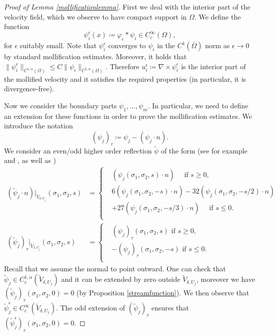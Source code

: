 \documentclass[12pt,a4paper]{article}
\theoremstyle{definition}
\theoremstyle{remark}
\numberwithin{equation}{section}
\begin{document}
\begin{proof}[Proof of Lemma \ref{mollificationlemma}]
First we deal with the interior part of the velocity field, which we observe to have compact support in $\Omega$. We define the function
\begin{equation*}
\psi^\epsilon_i (x) \coloneqq \varphi_\epsilon * \psi_i \in C_c^\infty (\Omega),
\end{equation*}
for $\epsilon$ suitably small. Note that $\psi^\epsilon_i$ converges to $\psi_i$ in the $C^1 (\overline{\Omega})$ norm as $\epsilon \rightarrow 0$ by standard mollification estimates. Moreover, it holds that $\lVert \psi^\epsilon_i \rVert_{C^{1, \alpha} (\Omega )} \leq C \lVert \psi_i \rVert_{C^{1, \alpha} (\Omega)}$. Therefore $u_i^\epsilon \coloneqq \nabla \times \psi^\epsilon_i$ is the interior part of the mollified velocity and it satisfies the required properties (in particular, it is divergence-free).

Now we consider the boundary parts $\psi_1, \ldots, \psi_m$. In particular, we need to define an extension for these functions in order to prove the mollification estimates. We introduce the notation
\begin{equation*}
(\psi_j)_{\tau} \coloneqq \psi_j - (\psi_j \cdot n).
\end{equation*}
We consider an even/odd higher order reflection $\widetilde{\psi}$ of the form (see for example \cite[~Lemma 6.37]{gilbarg} and \cite[~Theorem 4.26]{adams}, as well as \cite{babich})
\begin{align}
(\widetilde{\psi}_j \cdot n) \lvert_{\widetilde{V}_{\delta , U_j}} (\sigma_1, \sigma_2, s) &= \begin{cases}
&(\psi_j (\sigma_1, \sigma_2, s) \cdot n) \quad \text{ if } s \geq 0, \\
&6 (\psi_j ( \sigma_1, \sigma_2, -s) \cdot n) - 32 (\psi_j ( \sigma_1, \sigma_2, - s/2) \cdot n) \\
&+ 27 (\psi_j ( \sigma_1, \sigma_2, - s/3) \cdot n) \quad  \text{ if } s \leq 0. \\
\end{cases} \\
(\widetilde{\psi}_j)_{\tau} \lvert_{\widetilde{V}_{\delta , U_j}} (\sigma_1, \sigma_2, s) &= \begin{cases}
&(\psi_j)_{\tau} (\sigma_1, \sigma_2, s) \text{ if } s \geq 0, \\
&-(\psi_j)_{\tau} ( \sigma_1, \sigma_2, -s) \text{ if } s \leq 0. \\
\end{cases}
\end{align}
Recall that we assume the normal to point outward. One can check that $\widetilde{\psi}_j \in C^{1, \alpha}_c (\widetilde{V}_{\delta , U_j})$ and it can be extended by zero outside $\widetilde{V}_{\delta , U_j}$, moreover we have $(\widetilde{\psi}_j)_{\tau} (\sigma_1, \sigma_2 , 0) = 0$ (by Proposition \ref{streamfunction}). We then observe that $\widetilde{\psi}_j^\epsilon \in C^\infty_c (\widetilde{V}_{\delta , U_j})$. The odd extension of $(\widetilde{\psi}_j)_{\tau}$ ensures that $(\widetilde{\psi}_j^\epsilon )_{\tau} (\sigma_1 , \sigma_2, 0) = 0$.


\end{proof}
\end{document}
